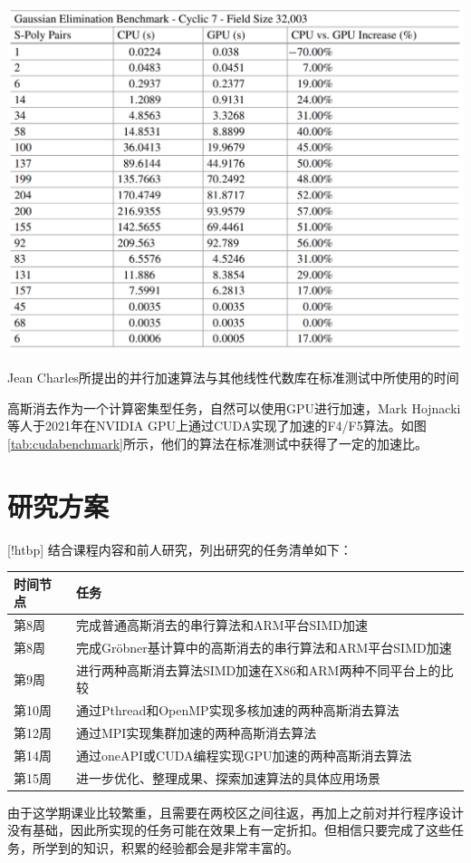 \documentclass[a4paper]{article}
\begin{document}
\begin{table}[!htbp]
    \centering
    \includegraphics[width=6in]{fig/cuda.png}
    \caption{Jean Charles所提出的并行加速算法与其他线性代数库在标准测试中所使用的时间\cite{faugere2010parallel}}
    \label{tab:cudabenchmark}
\end{table}

高斯消去作为一个计算密集型任务，自然可以使用GPU进行加速，Mark Hojnacki等人于2021年在NVIDIA GPU上通过CUDA实现了加速的F4/F5算法。如图\ref{tab:cudabenchmark}所示，他们的算法在标准测试中获得了一定的加速比。





\section{研究方案}[!htbp]
结合课程内容和前人研究，列出研究的任务清单如下：
\begin{table}[]
\centering
\begin{tabular}{@{}ll@{}}
\toprule
时间节点 & 任务                                  \\ \midrule
第8周  & 完成普通高斯消去的串行算法和ARM平台SIMD加速           \\
第8周  & 完成Gröbner基计算中的高斯消去的串行算法和ARM平台SIMD加速 \\
第9周  & 进行两种高斯消去算法SIMD加速在X86和ARM两种不同平台上的比较  \\
第10周 & 通过Pthread和OpenMP实现多核加速的两种高斯消去算法     \\
第12周 & 通过MPI实现集群加速的两种高斯消去算法                \\
第14周 & 通过oneAPI或CUDA编程实现GPU加速的两种高斯消去算法     \\
第15周 & 进一步优化、整理成果、探索加速算法的具体应用场景                          \\ \bottomrule
\end{tabular}
\end{table}

\newpage
由于这学期课业比较繁重，且需要在两校区之间往返，再加上之前对并行程序设计没有基础，因此所实现的任务可能在效果上有一定折扣。但相信只要完成了这些任务，所学到的知识，积累的经验都会是非常丰富的。








\newpage

 
\end{document}
